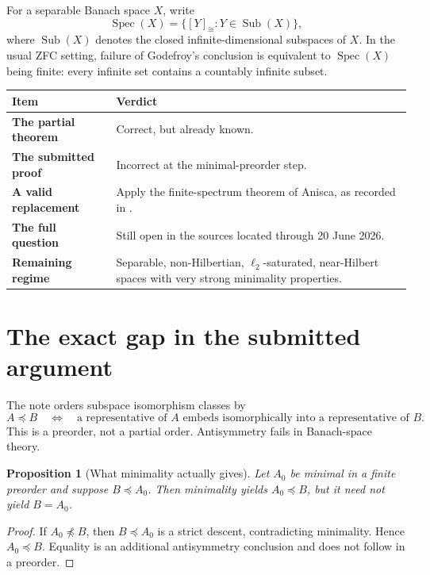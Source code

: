 \documentclass[11pt]{article}
\newtheorem{proposition}[theorem]{Proposition}
\theoremstyle{definition}
\theoremstyle{remark}
\newcommand{\ellTwo}{\ell_2}
\newcommand{\Sub}{\operatorname{Sub}}
\newcommand{\Spec}{\operatorname{Spec}}
\newcommand{\iso}{\cong}
\begin{document}
For a separable Banach space \(X\), write
\[
  \Spec(X)=\{[Y]_{\iso}:Y\in\Sub(X)\},
\]
where \(\Sub(X)\) denotes the closed infinite-dimensional subspaces of \(X\).  In the usual ZFC setting, failure of Godefroy's conclusion is equivalent to \(\Spec(X)\) being finite: every infinite set contains a countably infinite subset.

\begin{center}
\begin{tabularx}{0.95\textwidth}{>{\bfseries}p{}X}
\toprule
Item & Verdict \\
\midrule
The partial theorem & Correct, but already known. \\
The submitted proof & Incorrect at the minimal-preorder step. \\
A valid replacement & Apply the finite-spectrum theorem of Anisca, as recorded in \cite[Theorem 6.6]{CCRF2023}. \\
The full question & Still open in the sources located through 20 June 2026. \\
Remaining regime & Separable, non-Hilbertian, \(\ellTwo\)-saturated, near-Hilbert spaces with very strong minimality properties. \\
\bottomrule
\end{tabularx}
\end{center}

\section{The exact gap in the submitted argument}

The note orders subspace isomorphism classes by
\[
  A\preceq B
  \quad\Longleftrightarrow\quad
  \text{a representative of }A\text{ embeds isomorphically into a representative of }B.
\]
This is a preorder, not a partial order.  Antisymmetry fails in Banach-space theory.

\begin{proposition}[What minimality actually gives]
Let \(A_0\) be minimal in a finite preorder and suppose \(B\preceq A_0\).  Then minimality yields \(A_0\preceq B\), but it need not yield \(B=A_0\).
\end{proposition}

\begin{proof}
If \(A_0\not\preceq B\), then \(B\preceq A_0\) is a strict descent, contradicting minimality.  Hence \(A_0\preceq B\).  Equality is an additional antisymmetry conclusion and does not follow in a preorder.
\end{proof}
\end{document}
